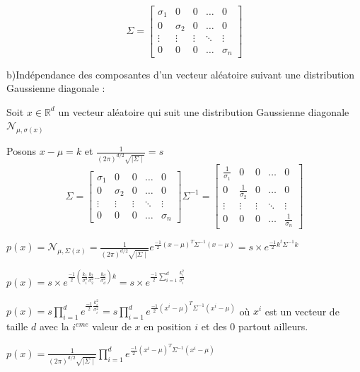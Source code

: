 \documentclass[a4paper,10pt]{article}
\begin{document}
\[
\Sigma =
\begin{bmatrix}
    \sigma_{1} & 0 & 0 & \dots  & 0 \\
    0 & \sigma_{2} & 0 & \dots  & 0 \\
    \vdots & \vdots & \vdots & \ddots & \vdots \\
    0 & 0 & 0 & \dots  & \sigma_{n}
\end{bmatrix}
\]

b)Indépendance des composantes d'un vecteur aléatoire suivant une distribution Gaussienne diagonale :

Soit $x \in \mathds{R}^{d}$ un vecteur aléatoire qui suit une distribution Gaussienne diagonale $\mathcal{N}_{\mu , \sigma(x)}$

Posons $x - \mu = k$ et $\frac{1}{(2 \pi)^{d/2} \sqrt{\mid{\Sigma} \mid}} = s$
\[
\Sigma =
\begin{bmatrix}
    \sigma_{1} & 0 & 0 & \dots  & 0 \\
    0 & \sigma_{2} & 0 & \dots  & 0 \\
    \vdots & \vdots & \vdots & \ddots & \vdots \\
    0 & 0 & 0 & \dots  & \sigma_{n}
\end{bmatrix}
\Sigma^{-1} =
\begin{bmatrix}
    \frac{1}{\sigma_{1}} & 0 & 0 & \dots  & 0 \\
    0 & \frac{1}{\sigma_{2}} & 0 & \dots  & 0 \\
    \vdots & \vdots & \vdots & \ddots & \vdots \\
    0 & 0 & 0 & \dots  & \frac{1}{\sigma_{n}}
\end{bmatrix}
\]

$p(x) = \mathcal{N}_{\mu , \Sigma(x)} = \frac{1}{(2 \pi)^{d/2} \sqrt{\mid{\Sigma} \mid}} e^{\frac{-1}{2} (x- \mu)^{T} \Sigma^{-1} (x- \mu) } = s \times e^{\frac{-1}{2} k^{t} \Sigma^{-1} k }$

$p(x) = s \times e^{\frac{-1}{2} (\frac{k_{1}}{\sigma_{1}^{2}} \frac{k_{2}}{\sigma_{2}^{2}} ... \frac{k_{d}}{\sigma_{d}^{2}} )k }  = s \times e^{\frac{-1}{2} \sum_{i=1}^{d} \frac{k_{i}^{2} }{\sigma_{i}^{2}} }$

$p(x) = s \prod_{i=1}^{d} e^{\frac{-1}{2} \frac{k_{i}^{2} }{\sigma_{i}^{2}} }  = s \prod_{i=1}^{d} e^{\frac{-1}{2} (x^{i} - \mu)^{T} \Sigma^{-1} (x^{i} - \mu) } $ où $x^{i}$ est un vecteur de taille $d$ avec la $i^{eme}$ valeur de $x$ en position $i$ et des 0 partout ailleurs.

$p(x) =\frac{1}{(2 \pi)^{d/2} \sqrt{\mid{\Sigma} \mid}} \prod_{i=1}^{d} e^{\frac{-1}{2} (x^{i} - \mu)^{T} \Sigma^{-1} (x^{i} - \mu) }  $
\end{document}
